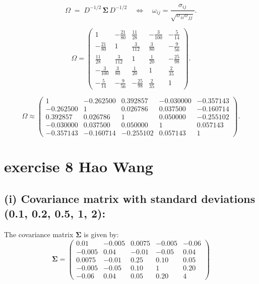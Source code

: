 \documentclass{article}
\let\normalSigma\Sigma
\renewcommand{\Sigma}{\bm{\normalSigma}} %
\begin{document}
\[
    \Omega \;=\; D^{-1/2}\,\Sigma\,D^{-1/2}
    \quad\Longleftrightarrow\quad
    \omega_{ij}=\frac{\sigma_{ij}}{\sqrt{\sigma_{ii}\sigma_{jj}}}.
\]

\[
    \Omega =
    \begin{pmatrix}
        1               & -\tfrac{21}{80} & \tfrac{11}{28}  & -\tfrac{3}{100} & -\tfrac{5}{14}  \\
        -\tfrac{21}{80} & 1               & \tfrac{3}{112}  & \tfrac{3}{80}   & -\tfrac{9}{56}  \\
        \tfrac{11}{28}  & \tfrac{3}{112}  & 1               & \tfrac{1}{20}   & -\tfrac{25}{98} \\
        -\tfrac{3}{100} & \tfrac{3}{80}   & \tfrac{1}{20}   & 1               & \tfrac{2}{35}   \\
        -\tfrac{5}{14}  & -\tfrac{9}{56}  & -\tfrac{25}{98} & \tfrac{2}{35}   & 1
    \end{pmatrix}.
\]

\[
    \Omega \approx
    \begin{pmatrix}
        1         & -0.262500 & 0.392857  & -0.030000 & -0.357143 \\
        -0.262500 & 1         & 0.026786  & 0.037500  & -0.160714 \\
        0.392857  & 0.026786  & 1         & 0.050000  & -0.255102 \\
        -0.030000 & 0.037500  & 0.050000  & 1         & 0.057143  \\
        -0.357143 & -0.160714 & -0.255102 & 0.057143  & 1
    \end{pmatrix}.
\]


\section{exercise 8 Hao Wang}

\subsection*{(i) Covariance matrix with standard deviations (0.1, 0.2, 0.5, 1, 2):}

The covariance matrix \(\Sigma\) is given by:
\[
\Sigma = \begin{pmatrix}
0.01 & -0.005 & 0.0075 & -0.005 & -0.06 \\
-0.005 & 0.04 & -0.01 & -0.05 & 0.04 \\
0.0075 & -0.01 & 0.25 & 0.10 & 0.05 \\
-0.005 & -0.05 & 0.10 & 1 & 0.20 \\
-0.06 & 0.04 & 0.05 & 0.20 & 4
\end{pmatrix}
\]
\end{document}
